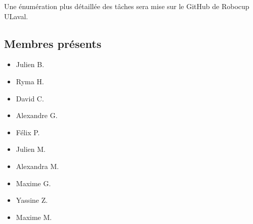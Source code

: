 \documentclass[12pt,letterpaper,twoside]{article}
\begin{document}
Une énumération plus détaillée des tâches sera mise sur le GitHub de Robocup ULaval.

\subsection*{Membres présents}
\begin{itemize}
\item Julien B.
\item Ryma H.
\item David C.
\item Alexandre G.
\item Félix P.
\item Julien M.
\item Alexandra M.
\item Maxime G.
\item Yassine Z.
\item Maxime M.
\end{itemize}
\end{document}
